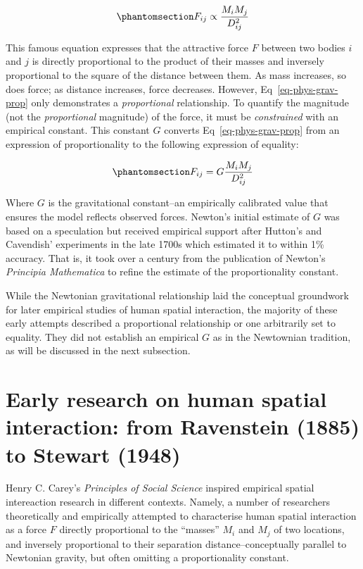 \documentclass[
  10pt,
  letterpaper,
]{article}
\begin{document}
\begin{equation}\phantomsection\label{eq-phys-grav-prop}{
F_{ij} \propto \frac{M_i M_j} {D_{ij}^{2}}
}\end{equation}

This famous equation expresses that the attractive force \(F\) between
two bodies \(i\) and \(j\) is directly proportional to the product of
their masses and inversely proportional to the square of the distance
between them. As mass increases, so does force; as distance increases,
force decreases. However, Eq~\ref{eq-phys-grav-prop} only demonstrates a
\emph{proportional} relationship. To quantify the magnitude (not the
\emph{proportional} magnitude) of the force, it must be
\emph{constrained} with an empirical constant. This constant \(G\)
converts Eq~\ref{eq-phys-grav-prop} from an expression of
proportionality to the following expression of equality:

\begin{equation}\phantomsection\label{eq-phys-grav}{
F_{ij} = G \frac{M_i M_j} {D_{ij}^{2}}
}\end{equation}

Where \(G\) is the gravitational constant--an empirically calibrated
value that ensures the model reflects observed forces. Newton's initial
estimate of \(G\) was based on a speculation but received empirical
support after Hutton's and Cavendish' experiments in the late 1700s
\citep{hutton_xxxiii_1778, cavendish_xxi_1798} which estimated it to
within 1\% accuracy. That is, it took over a century from the
publication of Newton's \emph{Principia Mathematica} to refine the
estimate of the proportionality constant.

While the Newtonian gravitational relationship laid the conceptual
groundwork for later empirical studies of human spatial interaction, the
majority of these early attempts described a proportional relationship
or one arbitrarily set to equality. They did not establish an empirical
\(G\) as in the Newtownian tradition, as will be discussed in the next
subsection.

\section{Early research on human spatial interaction: from Ravenstein
(1885) to Stewart
(1948)}\label{early-research-on-human-spatial-interaction-from-ravenstein-1885-to-stewart-1948}

Henry C. Carey's \emph{Principles of Social Science}
\citep{careyPrinciplesSocialScience1858} inspired empirical spatial
intereaction research in different contexts. Namely, a number of
researchers theoretically and empirically attempted to characterise
human spatial interaction as a force \(F\) directly proportional to the
``masses'' \(M_i\) and \(M_j\) of two locations, and inversely
proportional to their separation distance--conceptually parallel to
Newtonian gravity, but often omitting a proportionality constant.
\end{document}
